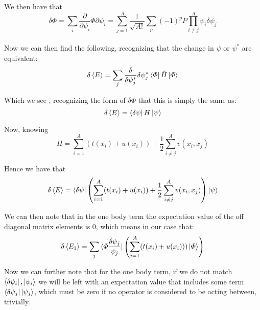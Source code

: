 \documentclass[11pt]{article} %
\begin{document}
We then have that\\

\begin{equation}
\delta \Phi=\sum_i \frac{\partial}{\partial \psi_i} \Phi \partial \psi_i=\sum_{j=1}^A \frac{1}{\sqrt{A!}}\sum_p (-1)^p P \prod_{i\neq j}^A \psi_i \delta \psi_j
\end{equation}
\\

Now we can then find the following, recognizing that the change in $\psi$ or $\psi^*$ are equivalent:\\

\begin{equation}
\delta \braket{E}=\sum_j \frac{\delta}{\delta \psi_j^*} \delta \psi_j^* \bra{\Phi}\hat{H} \ket{\Phi}
\end{equation}

Which we see , recognizing the form of $\delta \Phi$ that this is simply the same as:
\begin{equation}
\delta \braket{E}=\bra{\delta\psi}H\ket{\psi}
\end{equation}


Now, knowing\\

\begin{equation}
H=\sum_{i=1}^A(t(x_i)+u(x_i))+\frac{1}{2} \sum_{i\neq j}^A v(x_i,x_j)
\end{equation}

Hence we have that\\

\begin{equation}
\delta \braket{E}=\bra{\delta\psi}\left(\sum_{i=1}^A(t(x_i)+u(x_i))+\frac{1}{2} \sum_{i\neq j}^A v(x_i,x_j)\right)\ket{\psi}
\end{equation}

We can then note that in the one body term the expectation value of the off diagonal matrix elements is 0, which means in our case that:
\begin{equation}
\delta \braket{E_1}=\sum_j \bra{ \Phi \frac{\delta\psi_j}{\psi_j}}\left(\sum_{i=1}^A(t(x_i)+u(x_i)))\ket{\Phi }\right)
\end{equation}


Now we can further note that for the one body term, if we do not match $\bra{\delta \psi_i}, \ket{\psi_i }$ we will be left with an expectation value  that includes some term $\bra{\delta \psi_j}\ket{\psi_j}$, which must be zero if no operator is considered to be acting between, trivially.\\
\end{document}
